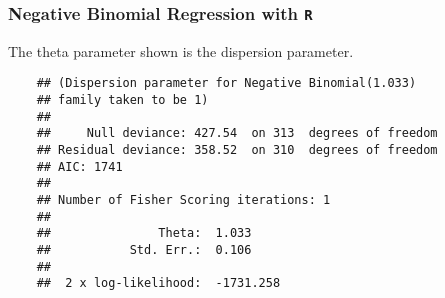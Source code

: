 \documentclass[MASTER.tex]{subfiles}
\begin{document}
\begin{frame}[fragile]
	\frametitle{Negative Binomial Regression with \texttt{R} }
	\Large
The theta parameter shown is the dispersion parameter. 

{
	\normalsize
	\begin{verbatim}
	## (Dispersion parameter for Negative Binomial(1.033) 
	## family taken to be 1)
	## 
	##     Null deviance: 427.54  on 313  degrees of freedom
	## Residual deviance: 358.52  on 310  degrees of freedom
	## AIC: 1741
	## 
	## Number of Fisher Scoring iterations: 1
	## 
	##               Theta:  1.033 
	##           Std. Err.:  0.106 
	## 
	##  2 x log-likelihood:  -1731.258
	\end{verbatim}
}	
\end{frame}
\end{document}
